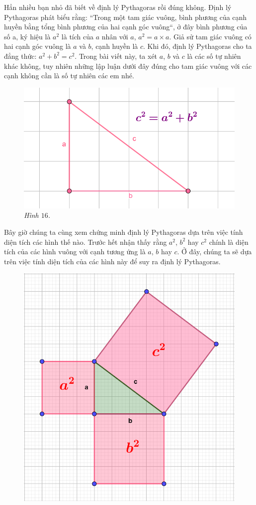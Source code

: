 \begin{multicols}{2}
	\vskip 0.1cm
	Hẳn nhiều bạn nhỏ đã biết về định lý Pythagoras rồi đúng không. Định lý Pythagoras phát biểu rằng: ``Trong một tam giác vuông, bình phương của cạnh huyền bằng tổng bình phương của hai cạnh góc vuông``, ở đây bình phương của số a, ký hiệu là $a^2$ là tích của $a$ nhân với $a$, $a^2=a\times a$.
	\vskip 0.1cm
	Giả sử tam giác vuông có hai cạnh góc vuông là $a$ và $b$, cạnh huyền là $c$. Khi đó, định lý Pythagoras cho ta đẳng thức: $a^2+b^2=c^2$. Trong bài viết này, ta xét $a$, $b$ và $c$ là các số tự nhiên khác không, tuy nhiên những lập luận dưới đây đúng cho tam giác vuông với các cạnh không cần là số tự nhiên các em nhé. 
	\begin{figure}[H]
		\centering
		\vspace*{-5pt}
		\captionsetup{labelformat= empty, justification=centering}
		\includegraphics[width=0.5\linewidth]{16}
		\caption{\small\textit{\color{toancuabi}Hình $16$.}}
		\vspace*{-10pt}
	\end{figure}
	Bây giờ chúng ta cùng xem chứng minh định lý Pythagoras dựa trên việc tính diện tích các hình thế nào.
	\vskip 0.1cm
	Trước hết nhận thấy rằng $a^2$, $b^2$ hay $c^2$ chính là diện tích của các hình vuông với cạnh tương ứng là $a$, $b$ hay $c$. Ở đây, chúng ta sẽ dựa trên việc tính diện tích của các hình này để suy ra định lý Pythagoras. 
	\begin{figure}[H]
		\centering
		\vspace*{-5pt}
		\captionsetup{labelformat= empty, justification=centering}
		\includegraphics[width=0.5\linewidth]{17}

\end{figure}
\end{multicols}
